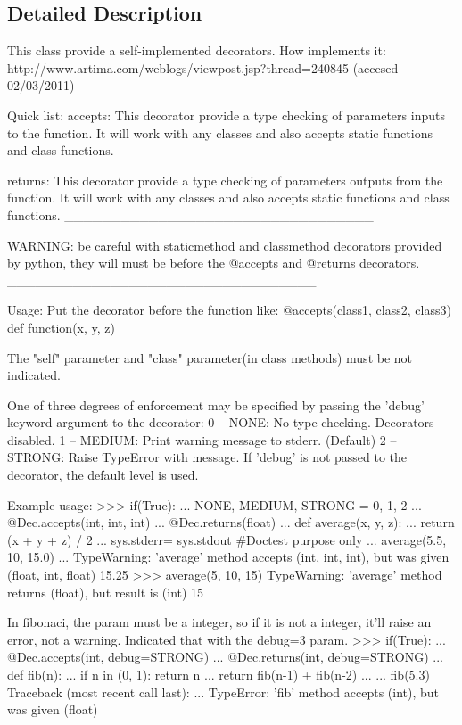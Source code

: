 \subsection{Detailed Description}
\begin{DoxyVerb}This class provide a self-implemented decorators.
How implements it: http://www.artima.com/weblogs/viewpost.jsp?thread=240845 (accesed 02/03/2011)

Quick list:
accepts: This decorator provide a type checking of parameters inputs to the function.
It will work with any classes and also accepts static functions and class functions.

returns: This decorator provide a type checking of parameters outputs from the function.
It will work with any classes and also accepts static functions and class functions.
_________________________________

WARNING: be careful with staticmethod and classmethod decorators provided by python, they will must
be before the @accepts and @returns decorators.
_________________________________

Usage:
Put the decorator before the function like:
@accepts(class1, class2, class3)
def function(x, y, z)

The "self" parameter and "class" parameter(in class methods) must be not indicated.

One of three degrees of enforcement may be specified by passing
the 'debug' keyword argument to the decorator:
    0 -- NONE:   No type-checking. Decorators disabled.
    1 -- MEDIUM: Print warning message to stderr. (Default)
    2 -- STRONG: Raise TypeError with message.
If 'debug' is not passed to the decorator, the default level is used.

Example usage:
    >>> if(True):
    ...     NONE, MEDIUM, STRONG = 0, 1, 2
    ...     @Dec.accepts(int, int, int)
    ...     @Dec.returns(float)
    ...     def average(x, y, z):
    ...         return (x + y + z) / 2
    ...     sys.stderr= sys.stdout #Doctest purpose only
    ...     average(5.5, 10, 15.0)
    ...
    TypeWarning:  'average' method accepts (int, int, int), but was given (float, int, float)
    15.25
    >>> average(5, 10, 15)
    TypeWarning:  'average' method returns (float), but result is (int)
    15

    In fibonaci, the param must be a integer, so if it is not a integer, it'll raise an error,
    not a warning. Indicated that with the debug=3 param.
    >>> if(True):
    ...     @Dec.accepts(int, debug=STRONG)
    ...     @Dec.returns(int, debug=STRONG)
    ...     def fib(n):
    ...         if n in (0, 1): return n
    ...         return fib(n-1) + fib(n-2)
    ...
    ...     fib(5.3)
    Traceback (most recent call last):
      ...
    TypeError: 'fib' method accepts (int), but was given (float)
\end{DoxyVerb}
 

